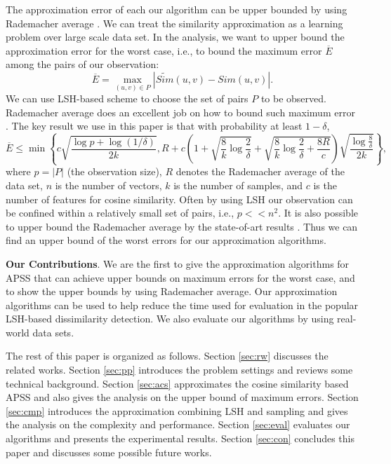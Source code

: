 \documentclass{article}
\begin{document}
The approximation error of each our algorithm can be upper bounded by using Rademacher average \cite{BM02,Mohri09,BBM05}. We can treat the similarity approximation as a learning problem over large scale data set. In the analysis, we want to upper bound the approximation error for the worst case, i.e., to bound the maximum error $\overline{E}$ among the pairs of our observation:
$$\overline{E} = \max_{(u,v)\in P} |\widetilde{Sim}(u,v) - Sim(u,v)|.$$
{\color{black}We can use LSH-based scheme to choose the set of pairs $P$ to be observed. }
Rademacher average does an excellent job on how to bound such maximum error \cite{RU15,RU16}. The key result we use in this paper is that with probability at least $1-\delta$,
$$\overline{E} \leq \min\left\{c\sqrt{\frac{\log p + \log(1/\delta)}{2k}}, R + c\left(1+\sqrt{\frac{8}{k}\log \frac{2}{\delta}} + \sqrt{\frac{8}{k}\log \frac{2}{\delta} + \frac{8R}{c}}\right)\sqrt{\frac{\log \frac{8}{\delta}}{2k}}\right\},$$
where $p=|P|$ (the observation size), $R$ denotes the Rademacher average of the data set, $n$ is the number of vectors, $k$ is the number of samples, and $c$ is the number of features for cosine similarity. Often by using LSH our observation can be confined within a relatively small set of pairs, i.e., $p << n^2$. 
It is also possible to upper bound the Rademacher average by the state-of-art results \cite{AGO14,RU15,RU16}. Thus we can find an upper bound of the worst errors for our approximation algorithms.

{\color{black}
\textbf{Our Contributions}. We are the first to give the approximation algorithms for APSS that can achieve upper bounds on maximum errors for the worst case, and to show the upper bounds by using Rademacher average. Our approximation algorithms can be used to help reduce the time used for evaluation in the popular LSH-based dissimilarity detection. We also evaluate our algorithms by using real-world data sets.
}

The rest of this paper is organized as follows. Section \ref{sec:rw} discusses the related works. Section \ref{sec:pp} introduces the problem settings and reviews some technical background. Section \ref{sec:acs} approximates the cosine similarity based APSS and also gives the analysis on the upper bound of maximum errors. Section \ref{sec:cmp} introduces the approximation combining LSH and sampling and gives the analysis on the complexity and performance. Section \ref{sec:eval} evaluates our algorithms and presents the experimental results. Section \ref{sec:con} concludes this paper and discusses some possible future works.
\end{document}
